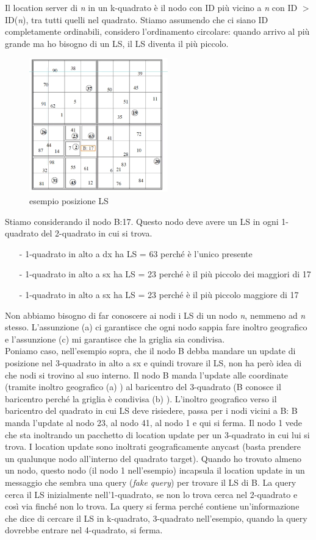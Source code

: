 \documentclass[12pt,italian]{report}
\begin{document}
\bigbreak
\noindent Il location server di \textit{n} in un k-quadrato è il nodo con ID più vicino a \textit{n} con ID $>$ ID(\textit{n}), tra tutti quelli nel quadrato. Stiamo assumendo che ci siano ID completamente ordinabili, considero l'ordinamento circolare: quando arrivo al più grande ma ho bisogno di un LS, il LS diventa il più piccolo. 
\newpage
\begin{figure}[h]
\centering
\includegraphics[width=60mm]{img/LSex.PNG}
\caption{esempio posizione LS}
\label{fig:hhtrhrt}
\end{figure}
\noindent Stiamo considerando il nodo B:17. Questo nodo deve avere un LS in ogni 1-quadrato del 2-quadrato in cui si trova. 
\begin{itemize}
    \item [-] 1-quadrato in alto a dx ha LS = 63 perché è l'unico presente
    \item [-] 1-quadrato in alto a sx ha LS = 23 perché è il più piccolo dei maggiori di 17
    \item [-] 1-quadrato in alto a sx ha LS = 23 perché è il più piccolo maggiore di 17
\end{itemize}
Non abbiamo bisogno di far conoscere ai nodi i LS di un nodo \textit{n}, nemmeno ad \textit{n} stesso. L'assunzione (a) ci garantisce che ogni nodo sappia fare inoltro geografico e l'assunzione (c) mi garantisce che la griglia sia condivisa. \\ Poniamo caso, nell'esempio sopra, che il nodo B debba mandare un update di posizione nel 3-quadrato in alto a sx e quindi trovare il LS, non ha però idea di che nodi si trovino al suo interno. Il nodo B manda l'update alle coordinate (tramite inoltro geografico (a) ) al baricentro del 3-quadrato (B conosce il baricentro perché la griglia è condivisa (b) ). 
\bigbreak
L'inoltro geografico verso il baricentro del quadrato in cui LS deve risiedere, passa per i nodi vicini a B: B manda l'update al nodo 23, al nodo 41, al nodo 1 e qui si ferma. Il nodo 1 vede che sta inoltrando un pacchetto di location update per un 3-quadrato in cui lui si trova. 
\bigbreak
I location update sono inoltrati geograficamente anycast (basta prendere un qualunque nodo all'interno del quadrato target). Quando ho trovato almeno un nodo, questo nodo (il nodo 1 nell'esempio) incapsula il location update in un messaggio che sembra una query (\textit{fake query}) per trovare il LS di B. La query cerca il LS inizialmente nell'1-quadrato, se non lo trova cerca nel 2-quadrato e così via finché non lo trova. La query si ferma perché contiene un'informazione che dice di cercare il LS in k-quadrato, 3-quadrato nell'esempio, quando la query dovrebbe entrare nel 4-quadrato, si ferma.
\end{document}
